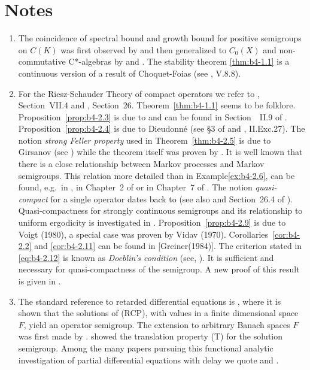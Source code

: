 \section*{Notes}

\begin{enumerate}[label=\emph{Section \arabic*:}, wide]
\item
 The coincidence of spectral bound and growth bound for positive semigroups on $C(K)$ was first observed by \citet{derndinger:1980} and then generalized to $C_0(X)$ and non-commutative C*-algebras by \citet{battydavies:1983} and \citet{grohneubrander:1981}. 
The stability theorem \ref{thm:b4-1.1} is a continuous version of a result of Choquet-Foias (see \citet{schaefer:1974}, V.8.8).

\item
 For the Riesz-Schauder Theory of compact operators we refer to \citet{dunfordschwartz:1958}, Section~VII.4 and \citet{pietsch:1978}, Section~26. 
Theorem~\ref{thm:b4-1.1} seems to be folklore. Proposition~\ref{prop:b4-2.3} is due to \citet{grothendieck:1953} and can be found in Section~~II.9 of \citet{schaefer:1974}. Proposition~\ref{prop:b4-2.4} is due to Dieudonné (see §3 of \citet{grothendieck:1953} and \citet{schaefer:1974}, II.Exc.27). The notion \emph{strong Feller property} used in Theorem~\ref{thm:b4-2.5} is due to Girsanov (see \citet{dynkin:1965}) while the theorem itself was proven by \citet{davies:1982}. 
It is well known that there is a close relationship between Markov processes and Markov semigroups. 
This relation more detailed than in Example\ref{ex:b4-2.6}, can be found, e.g.\ in \citet{dynkin:1965}, in Chapter~2 of \citet{vancasteren:1985} or in Chapter~7 of \citet{lamperti:1977}. 
The notion \emph{quasi-compact} for a single operator dates back to \citet{eberlein:1948} (see also \citet{yosidakakutani:1941} and Section~26.4 of \citet{pietsch:1978}). 
Quasi-compactness for strongly continuous semigroups and its relationship to uniform ergodicity is investigated in \citet{lin:1975}. 
Proposition~\ref{prop:b4-2.9} is due to Voigt (1980), a special case was proven by Vidav (1970). 
Corollaries~\ref{cor:b4-2.2} and \ref{cor:b4-2.11} can be found in [Greiner(1984)]. 
The criterion stated in \eqref{eq:b4-2.12} is known as \emph{Doeblin's condition} (see, \eg \citet{yosidakakutani:1941}). It is sufficient and
necessary for quasi-compactness of the semigroup. 
A new proof of this result is given in \citet{lotz:1981}.

\item The standard reference to retarded differential equations is \citet{hale:1977}, where it is shown that the solutions of (RCP), with values in a finite dimensional space $F$, yield an operator semigroup. 
The extension to arbitrary Banach spaces $F$ was first made by \citet{traviswebb:1974}. 
\citet{plant:1977} showed the translation property (T) for the solution semigroup. 
Among the many papers pursuing this functional analytic investigation of partial differential equations with delay we quote \citet{diblasioetal:1984} and \citet{kunischschappacher:1983}.


\end{enumerate}
